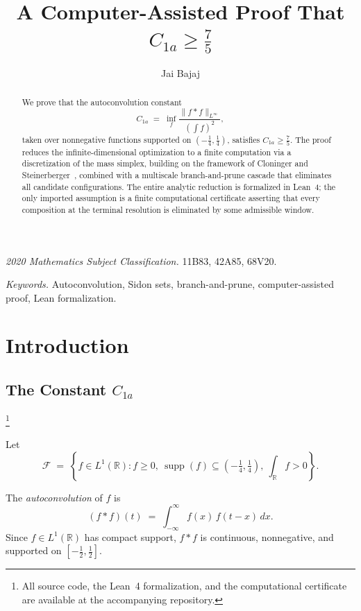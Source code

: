 \documentclass[11pt, letterpaper]{article}
\title{\texorpdfstring{%
  \bfseries A Computer-Assisted Proof That $C_{1a}\ge \tfrac75$
}{A Computer-Assisted Proof That C1a >= 7/5}}
\author{Jai Bajaj}
\date{}
\theoremstyle{paperplain}
\theoremstyle{paperdef}
\newcommand{\R}{\mathbb{R}}
\newcommand{\supp}{\operatorname{supp}}
\begin{document}
\maketitle

\begin{abstract}
We prove that the autoconvolution constant
\[
  C_{1a}
  \;=\;
  \inf_f \frac{\|f*f\|_{L^\infty}}{\left(\int f\right)^2},
\]
taken over nonnegative functions supported on
$(-\tfrac14,\tfrac14)$, satisfies $C_{1a}\ge \tfrac75$.
The proof reduces the infinite-dimensional optimization to a finite
computation via a discretization of the mass simplex, building on the
framework of Cloninger and Steinerberger~\cite{CS17}, combined with a
multiscale branch-and-prune cascade that eliminates all candidate
configurations.  The entire analytic reduction is formalized in Lean~4;
the only imported assumption is a finite computational certificate
asserting that every composition at the terminal resolution is
eliminated by some admissible window.
\end{abstract}
\noindent\textit{2020 Mathematics Subject Classification.}
11B83, 42A85, 68V20.

\smallskip

\noindent\textit{Keywords.}
Autoconvolution, Sidon sets, branch-and-prune, computer-assisted proof,
Lean formalization.

\medskip

\section{Introduction}\label{sec:intro}

\subsection{The Constant \texorpdfstring{$C_{1a}$}{C1a}}\footnote{All
  source code, the Lean~4 formalization, and the computational
  certificate are available at the accompanying repository.}

Let
\[
  \mathcal{F}
  \;=\;
  \left\{
    f \in L^1(\R) :
    f \ge 0,\ 
    \supp(f) \subseteq \left(-\tfrac14,\tfrac14\right),\
    \int_{\R} f > 0
  \right\}.
\]

The \emph{autoconvolution} of $f$ is
\[
  (f * f)(t) \;=\; \int_{-\infty}^{\infty} f(x)\, f(t - x)\, dx.
\]
Since $f \in L^1(\R)$ has compact support, $f*f$ is continuous,
nonnegative, and supported on $[-\tfrac12,\tfrac12]$.
\end{document}
